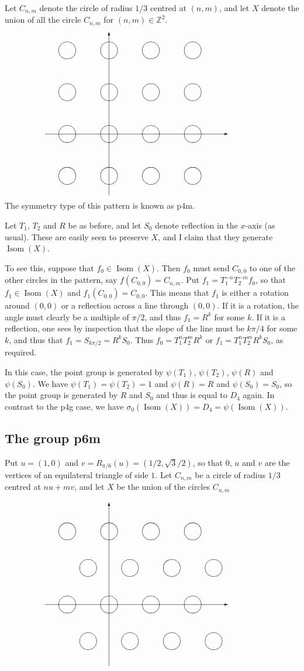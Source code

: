 \documentclass{amsart}
\DeclareMathOperator{\Isom}     {Isom}
\newcommand{\Z}         {{\mathbb{Z}}}
\newcommand{\sg}        {\sigma}
\renewcommand{\:}{\colon}
\theoremstyle{definition}
\begin{document}
Let $C_{n,m}$ denote the circle of radius $1/3$ centred at $(n,m)$,
and let $X$ denote the union of all the circle $C_{n,m}$ for
$(n,m)\in\Z^2$.
\[ \begin{picture}(250,200)(-10,-15)
 \setlength{\unitlength}{1.6pt}

 \put(-10, 37){\vector( 1, 0){140}}
 \put( 39,-10){\vector( 0, 1){125}}

 \multiput(  0,  0)( 0,32){4}{
  \multiput(  5,  5)(32, 0){4}{
   {\oval(13,13)}}}
\end{picture} \]
The symmetry type of this pattern is known as p4m.

Let $T_1$, $T_2$ and $R$ be as before, and let $S_0$ denote reflection
in the $x$-axis (as usual).  These are easily seen to preserve $X$,
and I claim that they generate $\Isom(X)$.

To see this, suppose that $f_0\in \Isom(X)$.  Then $f_0$ must send
$C_{0,0}$ to one of the other circles in the pattern, say
$f(C_{0,0})=C_{n,m}$.  Put $f_1=T_1^{-n}T_2^{-m}f_0$, so that
$f_1\in \Isom(X)$ and $f_1(C_{0,0})=C_{0,0}$.  This means that $f_1$ is
either a rotation around $(0,0)$ or a reflection across a line through
$(0,0)$.  If it is a rotation, the angle must clearly be a multiple of
$\pi/2$, and thus $f_1=R^k$ for some $k$.  If it is a reflection, one
sees by inspection that the slope of the line must be $k\pi/4$ for
some $k$, and thus that $f_1=S_{k\pi/2}=R^kS_0$.  Thus
$f_0=T_1^nT_2^mR^k$ or $f_1=T_1^nT_2^mR^kS_0$, as required.

In this case, the point group is generated by $\psi(T_1)$,
$\psi(T_2)$, $\psi(R)$ and $\psi(S_0)$.  We have
$\psi(T_1)=\psi(T_2)=1$ and $\psi(R)=R$ and $\psi(S_0)=S_0$, so the
point group is generated by $R$ and $S_0$ and thus is equal to $D_4$
again.  In contrast to the p4g case, we have
$\sg_0(\Isom(X))=D_4=\psi(\Isom(X))$.

\subsection{The group p6m}
\label{subsec-p-six-m}

Put $u=(1,0)$ and $v=R_{\pi/6}(u)=(1/2,\sqrt{3}/2)$, so that $0$, $u$
and $v$ are the vertices of an equilateral triangle of side $1$.  Let
$C_{n,m}$ be a circle of radius $1/3$ centred at $nu+mv$, and let $X$
be the union of the circles $C_{n,m}$

\[ \begin{picture}(250,200)(-10,-15)
 \setlength{\unitlength}{1.6pt}

 \put(-10, 37){\vector( 1, 0){140}}
 \put( 39,-10){\vector( 0, 1){125}}

 \multiput(  0,  0)( 0,56){2}{
  \multiput( 21,  9)(32, 0){4}{
   {\oval(13,13)}}}

 \multiput(  0,  0)( 0,56){2}{
  \multiput(  5, 37)(32, 0){4}{
   {\oval(13,13)}}}
\end{picture} \]
\end{document}
